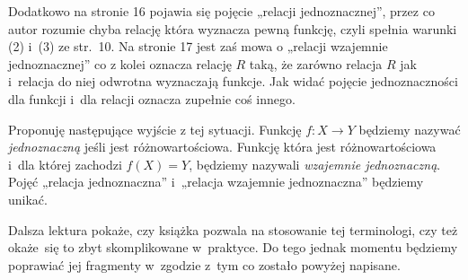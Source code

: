 \documentclass[a4paper,11pt]{article}
\begin{document}
Dodatkowo na stronie 16 pojawia się pojęcie „relacji jednoznacznej”,
przez co autor rozumie chyba relację która wyznacza pewną funkcję,
czyli spełnia warunki (2) i~(3) ze str.~10. Na stronie 17 jest zaś
mowa o „relacji wzajemnie jednoznacznej” co z kolei oznacza relację
$R$ taką, że zarówno relacja $R$ jak i~relacja do niej odwrotna
wyznaczają funkcje. Jak widać pojęcie jednoznaczności dla funkcji
i~dla relacji oznacza zupełnie coś innego.

Proponuję następujące wyjście z tej sytuacji. Funkcję $f: X \to Y$
będziemy nazywać \textit{jednoznaczną} jeśli jest różnowartościowa.
Funkcję która jest różnowartościowa i~dla której zachodzi
$f( X ) = Y$, będziemy nazywali \textit{wzajemnie jednoznaczną}. Pojęć
„relacja jednoznaczna” i~„relacja wzajemnie jednoznaczna” będziemy
unikać.

Dalsza lektura pokaże, czy książka pozwala na stosowanie tej
terminologi, czy też okaże~się to zbyt skomplikowane w~praktyce. Do
tego jednak momentu będziemy poprawiać jej fragmenty w~zgodzie z~tym
co zostało powyżej napisane.

\vspace{\spaceFour}





\end{document}
